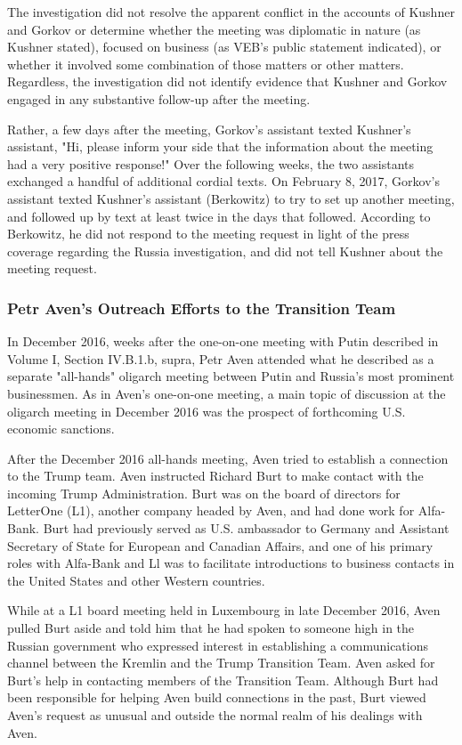 The investigation did not resolve the apparent conflict in the accounts of Kushner and Gorkov or determine whether the meeting was diplomatic in nature (as Kushner stated), focused on business (as VEB's public statement indicated), or whether it involved some combination of those matters or other matters.
Regardless, the investigation did not identify evidence that Kushner and Gorkov engaged in any substantive follow-up after the meeting.

Rather, a few days after the meeting, Gorkov's assistant texted Kushner's assistant, "Hi, please inform your side that the information about the meeting had a very positive response!"%
Over the following weeks, the two assistants exchanged a handful of additional cordial texts.%
On February 8, 2017, Gorkov's assistant texted Kushner's assistant (Berkowitz) to try to set up another meeting, and followed up by text at least twice in the days that followed.%
According to Berkowitz, he did not respond to the meeting request in light of the press coverage regarding the Russia investigation, and did not tell Kushner about the meeting request.%

\subsubsection{Petr Aven's Outreach Efforts to the Transition Team}

In December 2016, weeks after the one-on-one meeting with Putin described in Volume I, Section IV.B.1.b, supra, Petr Aven attended what he described as a separate "all-hands" oligarch meeting between Putin and Russia's most prominent businessmen.%
As in Aven's one-on-one meeting, a main topic of discussion at the oligarch meeting in December 2016 was the prospect of forthcoming U.S. economic sanctions.%

After the December 2016 all-hands meeting, Aven tried to establish a connection to the Trump team.
Aven instructed Richard Burt to make contact with the incoming Trump Administration.
Burt was on the board of directors for LetterOne (L1), another company headed by Aven, and had done work for Alfa-Bank.%
Burt had previously served as U.S. ambassador to Germany and Assistant Secretary of State for European and Canadian Affairs, and one of his primary roles with Alfa-Bank and Ll was to facilitate introductions to business contacts in the United States and other Western countries.%

While at a L1 board meeting held in Luxembourg in late December 2016, Aven pulled Burt aside and told him that he had spoken to someone high in the Russian government who expressed interest in establishing a communications channel between the Kremlin and the Trump Transition Team.%
Aven asked for Burt's help in contacting members of the Transition Team.%
Although Burt had been responsible for helping Aven build connections in the past, Burt viewed Aven's request as unusual and outside the normal realm of his dealings with Aven.%

